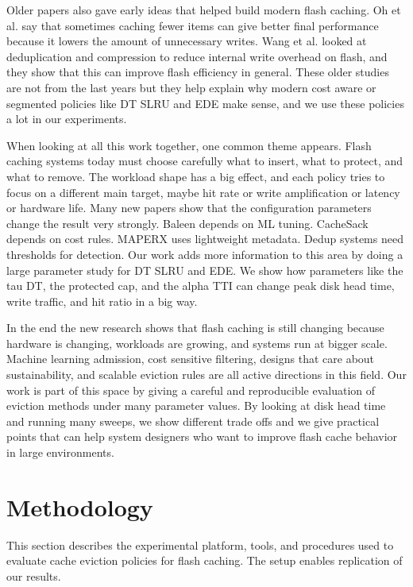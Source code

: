 \documentclass[sigconf]{acmart}
\begin{document}
Older papers also gave early ideas that helped build modern flash caching. Oh et al. \cite{Oh2010CachingLess} say that sometimes caching fewer items can give better final performance because it lowers the amount of unnecessary writes. Wang et al. \cite{Wang2020AustereCache} looked at deduplication and compression to reduce internal write overhead on flash, and they show that this can improve flash efficiency in general. These older studies are not from the last years but they help explain why modern cost aware or segmented policies like DT SLRU and EDE make sense, and we use these policies a lot in our experiments.

When looking at all this work together, one common theme appears. Flash caching systems today must choose carefully what to insert, what to protect, and what to remove. The workload shape has a big effect, and each policy tries to focus on a different main target, maybe hit rate or write amplification or latency or hardware life. Many new papers show that the configuration parameters change the result very strongly. Baleen depends on ML tuning. CacheSack depends on cost rules. MAPERX uses lightweight metadata. Dedup systems need thresholds for detection. Our work adds more information to this area by doing a large parameter study for DT SLRU and EDE. We show how parameters like the tau DT, the protected cap, and the alpha TTI can change peak disk head time, write traffic, and hit ratio in a big way.

In the end the new research shows that flash caching is still changing because hardware is changing, workloads are growing, and systems run at bigger scale. Machine learning admission, cost sensitive filtering, designs that care about sustainability, and scalable eviction rules are all active directions in this field. Our work is part of this space by giving a careful and reproducible evaluation of eviction methods under many parameter values. By looking at disk head time and running many sweeps, we show different trade offs and we give practical points that can help system designers who want to improve flash cache behavior in large environments.

\clearpage
\section{Methodology}
\label{sec:methodology}
\FloatBarrier

This section describes the experimental platform, tools, and procedures used to evaluate cache eviction policies for flash caching. The setup enables replication of our results.
\end{document}

